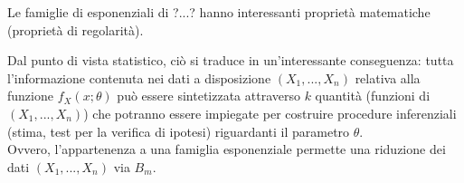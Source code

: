 \begin{oss}
Le famiglie di esponenziali di ?...? hanno interessanti proprietà matematiche (proprietà di regolarità).

Dal punto di vista statistico, ciò si traduce in un'interessante conseguenza: tutta l'informazione contenuta nei dati a disposizione $(X_1,...,X_n)$ relativa alla funzione $f_X (x; \theta)$ può essere sintetizzata attraverso $k$ quantità (funzioni di $(X_1,...,X_n)$) che potranno essere impiegate per costruire procedure inferenziali (stima, test per la verifica di ipotesi) riguardanti il parametro $\theta$.\\
Ovvero, l'appartenenza a una famiglia esponenziale permette una riduzione dei dati $(X_1,...,X_n)$ via $B_m$.\end{oss}